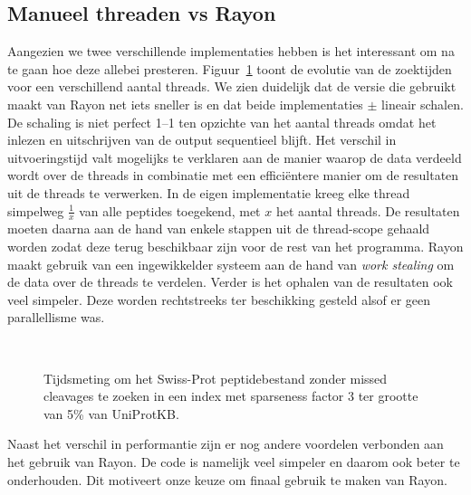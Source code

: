 \subsection{Manueel threaden vs Rayon}\label{subsec:manueel-threaden-vs-rayon}
Aangezien we twee verschillende implementaties hebben is het interessant om na te gaan hoe deze allebei presteren.
Figuur~\ref{fig:threading_default_vs_rayon} toont de evolutie van de zoektijden voor een verschillend aantal threads.
We zien duidelijk dat de versie die gebruikt maakt van Rayon net iets sneller is en dat beide implementaties $\pm$ lineair schalen.
De schaling is niet perfect 1--1 ten opzichte van het aantal threads omdat het inlezen en uitschrijven van de output sequentieel blijft.
Het verschil in uitvoeringstijd valt mogelijks te verklaren aan de manier waarop de data verdeeld wordt over de threads in combinatie met een efficiëntere manier om de resultaten uit de threads te verwerken.
In de eigen implementatie kreeg elke thread simpelweg $\frac{1}{x}$ van alle peptides toegekend, met $x$ het aantal threads.
De resultaten moeten daarna aan de hand van enkele stappen uit de thread-scope gehaald worden zodat deze terug beschikbaar zijn voor de rest van het programma.
Rayon maakt gebruik van een ingewikkelder systeem aan de hand van \textit{work stealing}\cite{rayon_stealing} om de data over de threads te verdelen.
Verder is het ophalen van de resultaten ook veel simpeler.
Deze worden rechtstreeks ter beschikking gesteld alsof er geen parallellisme was.

\begin{figure}[H]
    \centering
    \\[4ex] %

    \caption{Tijdsmeting om het Swiss-Prot peptidebestand zonder missed cleavages te zoeken in een index met sparseness factor 3 ter grootte van 5\% van UniProtKB.}\label{fig:threading_default_vs_rayon}
\end{figure}

Naast het verschil in performantie zijn er nog andere voordelen verbonden aan het gebruik van Rayon.
De code is namelijk veel simpeler en daarom ook beter te onderhouden.
Dit motiveert onze keuze om finaal gebruik te maken van Rayon.

